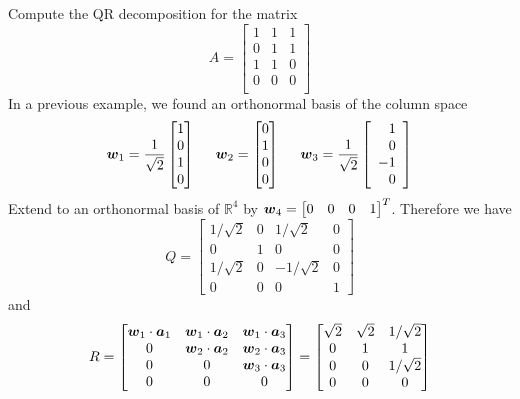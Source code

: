 \begin{example}
Compute the QR decomposition for the matrix
$$
A = \begin{bmatrix} 1 & 1 & 1 \\ 0 & 1 & 1 \\  1 & 1 & 0 \\  0 & 0 & 0 \\ \end{bmatrix}
$$
In a previous example, we found an orthonormal basis of the column space
$$
\boldsymbol{w}_1 = \frac{1}{\sqrt{2}} \begin{bmatrix} 1 \\ 0 \\ 1 \\ 0 \end{bmatrix}
\hspace{5mm}
\boldsymbol{w}_2 = \begin{bmatrix} 0 \\ 1 \\ 0 \\ 0 \end{bmatrix}
\hspace{5mm}
\boldsymbol{w}_3 = \frac{1}{\sqrt{2}} \left[ \begin{array}{r} 1 \\ 0 \\ -1 \\ 0 \end{array} \right]
$$
Extend to an orthonormal basis of $\mathbb{R}^4$ by $\boldsymbol{w}_4 = \begin{bmatrix} 0 & 0 & 0 & 1 \end{bmatrix}^T$. Therefore we have
$$
Q =
\begin{bmatrix}
1/\sqrt{2} & 0 & 1/\sqrt{2} & 0 \\
0 & 1 & 0 & 0 \\
1/\sqrt{2} & 0 & -1/\sqrt{2} & 0 \\
0 & 0 & 0 & 1
\end{bmatrix}
$$
and
$$
R =
\begin{bmatrix}
\boldsymbol{w}_1 \cdot \boldsymbol{a}_1 & \boldsymbol{w}_1 \cdot \boldsymbol{a}_2 & \boldsymbol{w}_1 \cdot \boldsymbol{a}_3 \\
0 & \boldsymbol{w}_2 \cdot \boldsymbol{a}_2 & \boldsymbol{w}_2 \cdot \boldsymbol{a}_3 \\
0 & 0 & \boldsymbol{w}_3 \cdot \boldsymbol{a}_3 \\
0 & 0 & 0
\end{bmatrix}
=
\begin{bmatrix}
\sqrt{2} & \sqrt{2} & 1/\sqrt{2} \\
0 & 1 & 1 \\
0 & 0 & 1/\sqrt{2} \\
0 & 0 & 0
\end{bmatrix}
$$
\end{example}

